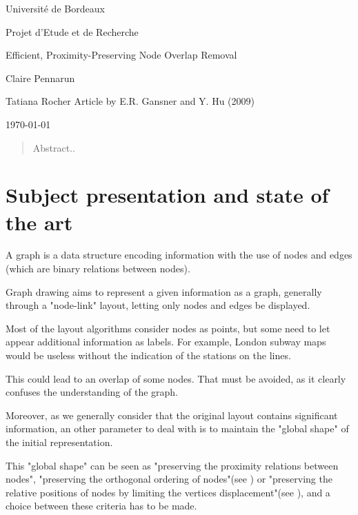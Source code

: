 \documentclass[12pt]{report}
\begin{document}
\begin{titlepage}
\begin{center}

\hfill

\bigskip
\huge{Université de Bordeaux \par \Large Projet d'Etude et de Recherche} 
\vfill
\bigskip 
\Huge 
\bigskip Efficient, Proximity-Preserving Node Overlap Removal \par 
\vfill
\Large Claire Pennarun \par 
		Tatiana Rocher
\vfill
\Large Article by E.R. Gansner and Y. Hu (2009)	
		\bigskip 
\bigskip

\Large
\today
\end{center}
\end{titlepage}

\tableofcontents
\newpage


\begin{abstract}
Abstract..
\end{abstract}


\chapter{Subject presentation and state of the art}

A graph is a data structure encoding information with the use of nodes and edges (which are binary relations between nodes).

Graph drawing aims to represent a given information as a graph, generally through a "node-link" layout, letting only nodes and edges be displayed. 

\bigskip
Most of the layout algorithms consider nodes as points, but some need to let appear additional information as labels. For example, London subway maps would be useless without the indication of the stations on the lines.

This could lead to an overlap of some nodes. That must be avoided, as it clearly confuses the understanding of the graph.

Moreover, as we generally consider that the original layout contains significant information, an other parameter to deal with is to maintain the "global shape" of the initial representation. 

This "global shape" can be seen as "preserving the proximity relations between nodes", "preserving the orthogonal ordering of nodes"(see \cite{Mis95}) or "preserving the relative positions of nodes by limiting the vertices displacement"(see \cite{Gansner98}), and a choice between these criteria has to be made.
\end{document}
